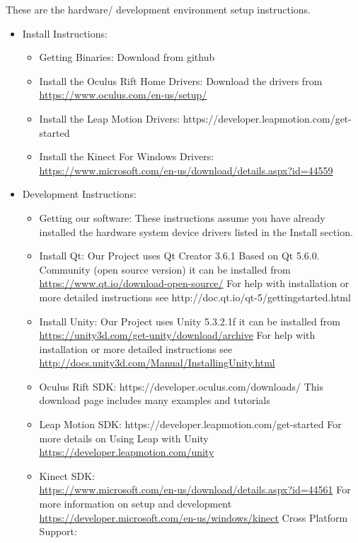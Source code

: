 \documentclass[a4paper,10pt]{article}
\begin{document}
These are the hardware/ development environment setup instructions. 
\begin{itemize}
\item Install Instructions:
\begin{itemize}
\item  Getting Binaries: Download from github
  \item Install the Oculus Rift Home Drivers: Download the drivers from~\\ \url{https://www.oculus.com/en-us/setup/}
  \item Install the Leap Motion Drivers: https://developer.leapmotion.com/get-started
  \item Install the Kinect For Windows Drivers: ~\\\url{https://www.microsoft.com/en-us/download/details.aspx?id=44559}
\end{itemize}
\item Development Instructions:
  \begin{itemize}
  \item Getting our software: These instructions assume you have already installed the hardware system device drivers 
listed in the Install section.
\item Install Qt:
Our Project uses Qt Creator 3.6.1 Based on Qt 5.6.0. Community (open source version) 
it can be installed from ~\\\url{https://www.qt.io/download-open-source/}
For help with installation or more detailed instructions see
http://doc.qt.io/qt-5/gettingstarted.html 
\item Install Unity:
Our Project uses Unity 5.3.2.1f 
it can be installed from 
~\\\url{https://unity3d.com/get-unity/download/archive}
For help with installation or more detailed instructions see
~\\\url{http://docs.unity3d.com/Manual/InstallingUnity.html}
\item Oculus Rift SDK:
https://developer.oculus.com/downloads/
This download page includes many examples and tutorials
\item Leap Motion SDK:
https://developer.leapmotion.com/get-started
For more details on Using Leap with Unity ~\\\url{https://developer.leapmotion.com/unity} 
\item Kinect SDK:
~\\\url{https://www.microsoft.com/en-us/download/details.aspx?id=44561}
For more information on setup and development  ~\\\url{https://developer.microsoft.com/en-us/windows/kinect}
Cross Platform Support:


\end{itemize}
\end{itemize}
\end{document}
